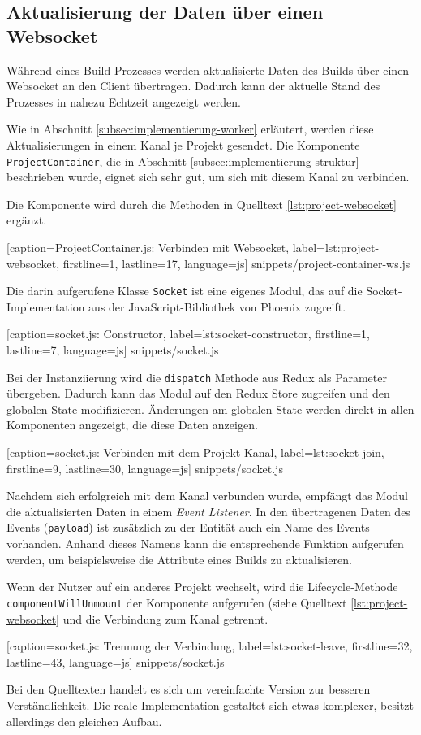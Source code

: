 \subsection{Aktualisierung der Daten über einen Websocket}

Während eines Build-Prozesses werden aktualisierte Daten des Builds über einen Websocket an den Client übertragen. Dadurch kann der aktuelle Stand des Prozesses in nahezu Echtzeit angezeigt werden.

Wie in Abschnitt \ref{subsec:implementierung-worker} erläutert, werden diese Aktualisierungen in einem Kanal je Projekt gesendet. Die Komponente \texttt{ProjectContainer}, die in Abschnitt \ref{subsec:implementierung-struktur} beschrieben wurde, eignet sich sehr gut, um sich mit diesem Kanal zu verbinden.

Die Komponente wird durch die Methoden in Quelltext \ref{lst:project-websocket} ergänzt.


  [caption={ProjectContainer.js: Verbinden mit Websocket},
  label={lst:project-websocket},
  firstline=1,
  lastline=17,
  language=js]
  {snippets/project-container-ws.js}

Die darin aufgerufene Klasse \texttt{Socket} ist eine eigenes Modul, das auf die Socket-Implementation aus der JavaScript-Bibliothek von Phoenix zugreift.


  [caption={socket.js: Constructor},
  label={lst:socket-constructor},
  firstline=1,
  lastline=7,
  language=js]
  {snippets/socket.js}

Bei der Instanziierung wird die \texttt{dispatch} Methode aus Redux als Parameter übergeben. Dadurch kann das Modul auf den Redux Store zugreifen und den globalen State modifizieren. Änderungen am globalen State werden direkt in allen Komponenten angezeigt, die diese Daten anzeigen.


  [caption={socket.js: Verbinden mit dem Projekt-Kanal},
  label={lst:socket-join},
  firstline=9,
  lastline=30,
  language=js]
  {snippets/socket.js}

Nachdem sich erfolgreich mit dem Kanal verbunden wurde, empfängt das Modul die aktualisierten Daten in einem \emph{Event Listener}. In den übertragenen Daten des Events (\texttt{payload}) ist zusätzlich zu der Entität auch ein Name des Events vorhanden. Anhand dieses Namens kann die entsprechende Funktion aufgerufen werden, um beispielsweise die Attribute eines Builds zu aktualisieren.

Wenn der Nutzer auf ein anderes Projekt wechselt, wird die Lifecycle-Methode \texttt{componentWillUnmount} der Komponente aufgerufen (siehe Quelltext \ref{lst:project-websocket} und die Verbindung zum Kanal getrennt.


  [caption={socket.js: Trennung der Verbindung},
  label={lst:socket-leave},
  firstline=32,
  lastline=43,
  language=js]
  {snippets/socket.js}

Bei den Quelltexten handelt es sich um vereinfachte Version zur besseren Verständlichkeit. Die reale Implementation gestaltet sich etwas komplexer, besitzt allerdings den gleichen Aufbau.
